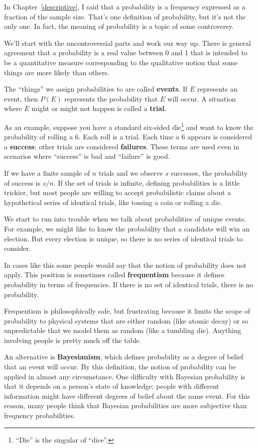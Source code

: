 \documentclass[12pt]{book}
\begin{document}
In Chapter~\ref{descriptive}, I said that a probability is a frequency
expressed as a fraction of the sample size.  That's one definition of
probability, but it's not the only one.  In fact, the meaning
of probability is a topic of some controversy.

We'll start with the uncontroversial parts and work our way up.  There
is general agreement that a probability is a real value between 0 and
1 that is intended to be a quantitative measure corresponding to the
qualitative notion that some things are more likely than others.

The ``things'' we assign probabilities to are called {\bf events}.  If
$E$ represents an event, then $P(E)$ represents the probability that
$E$ will occur.  A situation where $E$ might or might not happen is
called a {\bf trial}.

As an example, suppose you have a standard six-sided
die\footnote{``Die'' is the singular of ``dice''.} and want to know
the probability of rolling a 6.  Each roll is a trial.
Each time a 6 appears is considered a {\bf success}; other trials are
considered {\bf failures}.  These terms are used even in scenarios
where ``success'' is bad and ``failure'' is good.

If we have a finite sample of $n$ trials and we observe $s$ successes,
the probability of success is $s/n$.  If the set of trials is
infinite, defining probabilities is a little trickier, but most people
are willing to accept probabilistic claims about a hypothetical series
of identical trials, like tossing a coin or rolling a die.

We start to run into trouble when we talk about probabilities of
unique events.  For example, we might like to know the probability
that a candidate will win an election.  But every election is unique,
so there is no series of identical trials to consider.

In cases like this some people would say that the notion of
probability does not apply.  This position is sometimes called {\bf
  frequentism} because it defines probability in terms of frequencies.
If there is no set of identical trials, there is no probability.

Frequentism is philosophically safe, but
frustrating because it limits the scope of probability to physical
systems that are either random (like atomic decay) or so unpredictable
that we model them as random (like a tumbling die).  Anything involving
people is pretty much off the table.

An alternative is {\bf Bayesianism}, which defines probability as
a degree of belief that an event will occur.  By this definition,
the notion of probability can be applied in almost any circumstance.
One difficulty with Bayesian probability is that it depends on
a person's state of knowledge; people with different information
might have different degrees of belief about the same event.  For
this reason, many people think that Bayesian probabilities are
more subjective than frequency probabilities.
\end{document}
